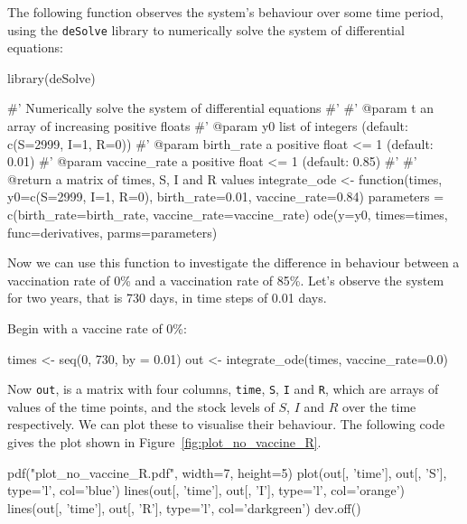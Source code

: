 The following function observes the system's behaviour over some time period,
using the \texttt{deSolve} library to numerically solve the system of
differential equations:

\begin{Rin}
library(deSolve)

#' Numerically solve the system of differential equations
#'
#' @param t an array of increasing positive floats
#' @param y0 list of integers (default: c(S=2999, I=1, R=0))
#' @param birth_rate a positive float <= 1 (default: 0.01)
#' @param vaccine_rate a positive float <= 1 (default: 0.85)
#'
#' @return a matrix of times, S, I and R values
integrate_ode <- function(times,
                          y0=c(S=2999, I=1, R=0),
                          birth_rate=0.01,
                          vaccine_rate=0.84){
  parameters = c(birth_rate=birth_rate,
                 vaccine_rate=vaccine_rate)
  ode(y=y0, times=times, func=derivatives, parms=parameters)
}
\end{Rin}

Now we can use this function to investigate the difference in behaviour between
a vaccination rate of 0\% and a vaccination rate of 85\%. Let's observe the
system for two years, that is 730 days, in time steps of 0.01 days.

Begin with a vaccine rate of 0\%:

\begin{Rin}
times <- seq(0, 730, by = 0.01)
out <- integrate_ode(times, vaccine_rate=0.0)
\end{Rin}

Now \texttt{out}, is a matrix with four columns,  \texttt{time},
\texttt{S}, \texttt{I} and \texttt{R}, which are arrays of
values of the time points, and the stock levels of $S$, $I$ and $R$ over the
time respectively.
We can plot these to visualise their behaviour.
The following code gives the plot shown in Figure~\ref{fig:plot_no_vaccine_R}.


\begin{Rin-no-test}
pdf("plot_no_vaccine_R.pdf", width=7, height=5)
plot(out[, 'time'], out[, 'S'], type='l', col='blue')
lines(out[, 'time'], out[, 'I'], type='l', col='orange')
lines(out[, 'time'], out[, 'R'], type='l', col='darkgreen')
dev.off()
\end{Rin-no-test}


